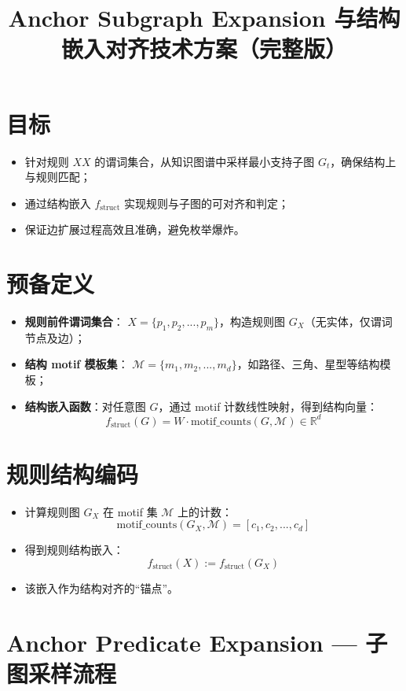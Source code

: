 \documentclass{article}
\title{Anchor Subgraph Expansion 与结构嵌入对齐技术方案（完整版）}
\author{}
\date{}
\begin{document}
\maketitle

\section{目标}
\begin{itemize}
    \item 针对规则 $XX$ 的谓词集合，从知识图谱中采样最小支持子图 $G_t$，确保结构上与规则匹配；
    \item 通过结构嵌入 $f_{\text{struct}}$ 实现规则与子图的可对齐和判定；
    \item 保证边扩展过程高效且准确，避免枚举爆炸。
\end{itemize}

\section{预备定义}
\begin{itemize}
    \item \textbf{规则前件谓词集合}： $X = \{ p_1, p_2, ..., p_m \}$，构造规则图 $G_X$（无实体，仅谓词节点及边）；
    \item \textbf{结构 motif 模板集}： $\mathcal{M} = \{ m_1, m_2, ..., m_d \}$，如路径、三角、星型等结构模板；
    \item \textbf{结构嵌入函数}：对任意图 $G$，通过 motif 计数线性映射，得到结构向量：
    $$f_{\text{struct}}(G) = W \cdot \text{motif\_counts}(G, \mathcal{M}) \in \mathbb{R}^d$$
\end{itemize}

\section{规则结构编码}
\begin{itemize}
    \item 计算规则图 $G_X$ 在 motif 集 $\mathcal{M}$ 上的计数：
    $$\text{motif\_counts}(G_X, \mathcal{M}) = [c_1, c_2, ..., c_d]$$
    \item 得到规则结构嵌入：
    $$f_{\text{struct}}(X) := f_{\text{struct}}(G_X)$$
    \item 该嵌入作为结构对齐的“锚点”。
\end{itemize}

\section{Anchor Predicate Expansion — 子图采样流程}
\end{document}
